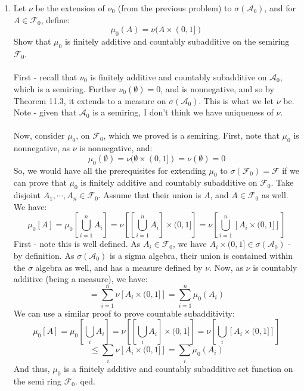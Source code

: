 \documentclass[12pt,a4paper]{article}
\newcommand{\1}[1]{\mathbbm{1}\left\{ #1 \right\}}
\newcommand{\acal}{\mathcal{A}}
\newcommand{\fcal}{\mathcal{F}}
\begin{document}
\begin{enumerate}
	\item Let $\nu$ be the extension of $\nu_0$ (from the previous problem) to $\sigma(\acal_0)$, and for $A \in \fcal_0$, define:
	$$
		\mu_0(A) = \nu(A \times (0,1])
	$$
	Show that $\mu_0$ is finitely additive and countably subadditive on the semiring $\fcal_0$.
	\\\\
	First - recall that $\nu_0$ is finitely additive and countably subadditive on $\acal_0$, which is a semiring. Further $\nu_0(\emptyset) = 0$, and is nonnegative, and so by Theorem 11.3, it extends to a measure on $\sigma(\acal_0)$. This is what we let $\nu$ be. Note - given that $\acal_0$ is a semiring, I don't think we have uniqueness of $\nu$.
	\\\\
	Now, consider $\mu_0$, on $\fcal_0$, which we proved is a semiring. First, note that $\mu_0$ is nonnegative, as $\nu$ is nonnegative, and:
	$$
		\mu_0(\emptyset) = \nu(\emptyset \times (0,1]) = \nu(\emptyset) = 0
	$$
	So, we would have all the prerequisites for extending $\mu_0$ to $\sigma(\fcal_0) = \fcal$ if we can prove that $\mu_0$ is finitely additive and countably subadditive on $\fcal_0$. Take disjoint $A_1, \cdots, A_n \in \fcal_0$. Assume that their union is $A$, and $A \in \fcal_0$ as well. We have:
	$$
		\mu_0\left[A\right] =
		\mu_0\left[\bigcup_{i=1}^n A_i\right] =
		\nu\left[\left[\bigcup_{i=1}^n A_i\right] \times (0,1]\right] =
		\nu\left[\bigcup_{i=1}^n \left[A_i \times (0,1]\right]\right]
	$$
	First - note this is well defined. As $A_i \in \fcal_0$, we have $A_i \times (0,1] \in \sigma(\acal_0)$ - by definition. As $\sigma(\acal_0)$ is a sigma algebra, their union is contained within the $\sigma$ algebra as well, and has a measure defined by $\nu$. Now, as $\nu$ is countably additive (being a measure), we have:
	$$
		=
		\sum_{i=1}^n
		\nu\left[A_i \times (0,1]\right] =
		\sum_{i=1}^n \mu_0(A_i)
	$$
	We can use a similar proof to prove countable subadditivity:
	$$
		\mu_0\left[A\right] =
		\mu_0\left[\bigcup_i A_i\right] = 
		\nu\left[\left[\bigcup_i A_i\right] \times (0,1]\right] =
		\nu\left[\bigcup_i \left[A_i \times (0,1]\right]\right]
	$$
	$$
		\leq \sum_i \nu\left[A_i \times (0,1]\right] = \sum_i \mu_0(A_i)
	$$
	And thus, $\mu_0$ is a finitely additive and countably subadditive set function on the semi ring $\fcal_0$. qed.
	
	
\end{enumerate}
\end{document}

